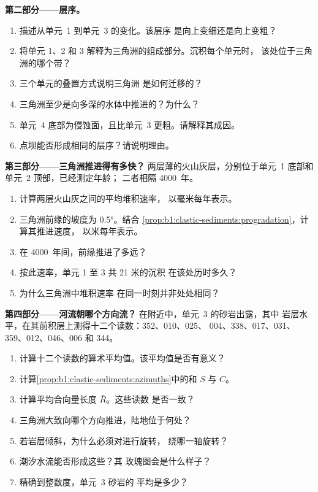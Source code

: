 \begin{problem}
\medskip
\noindent\textbf{第二部分——层序。}
\begin{enumerate}[resume]
  \item 描述从单元~1 到单元~3 的变化。该层序
        是向上变细还是向上变粗？
  \item 将单元 1、2 和 3 解释为三角洲的组成部分。沉积每个单元时，
        该处位于三角洲的哪个带？
  \item 三个单元的叠置方式说明三角洲
        是如何迁移的？
  \item 三角洲至少是向多深的水体中推进的？为什么？
  \item 单元~4 底部为侵蚀面，且比单元~3 更粗。请解释其成因。
  \item 点坝能否形成相同的层序？请说明理由。
\end{enumerate}

\medskip
\noindent\textbf{第三部分——三角洲推进得有多快？}
两层薄的火山灰层，分别位于单元~1 底部和单元~2 顶部，已经测定年龄；
二者相隔 \num{4000}~年。
\begin{enumerate}[resume]
  \item 计算两层火山灰之间的平均堆积速率，
        以毫米每年表示。
  \item 三角洲前缘的坡度为 \ang{0.5}。结合
        \cref{prop:b1:clastic-sediments:progradation}，计算其推进速度，
        以米每年表示。
  \item 在 \num{4000}~年间，前缘推进了多远？
  \item 按此速率，单元 1 至 3 共 21 米的沉积
        在该处历时多久？
  \item 为什么三角洲中堆积速率
        在同一时刻并非处处相同？
\end{enumerate}

\medskip
\noindent\textbf{第四部分——河流朝哪个方向流？}
在附近中，单元~3 的砂岩出露，其中
岩层水平，在其前积层上测得十二个读数：352、010、025、
004、338、017、031、359、012、046、006 和 344。
\begin{enumerate}[resume]
  \item 计算十二个读数的算术平均值。该平均值是否有意义？
  \item 计算\cref{prop:b1:clastic-sediments:azimuths}中的和 $S$ 与 $C$。
  \item 计算平均合向量长度 $\bar R$。这些读数
        是否一致？
  \item 三角洲大致向哪个方向推进，陆地位于何处？
  \item 若岩层倾斜，为什么必须对进行旋转，
        绕哪一轴旋转？
  \item 潮汐水流能否形成这些？其
        玫瑰图会是什么样子？
  \item 精确到整数度，单元~3 砂岩的
        平均是多少？
\end{enumerate}
\end{problem}
